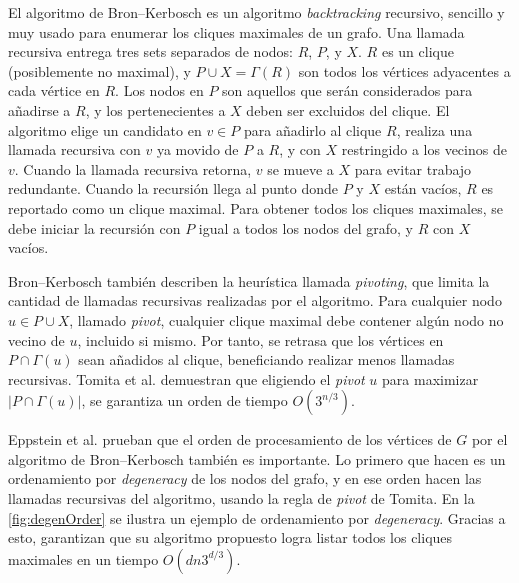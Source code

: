El algoritmo de Bron–Kerbosch \cite{bron1973algorithm} es un algoritmo \textit{backtracking} recursivo, sencillo y muy usado para enumerar los cliques maximales de un grafo. Una llamada recursiva entrega tres sets separados de nodos: $R$, $P$, y $X$. $R$ es un clique (posiblemente no maximal), y $P \cup X = \Gamma(R)$ son todos los vértices adyacentes a cada vértice en $R$. Los nodos en $P$ son aquellos que serán considerados para añadirse a $R$, y los pertenecientes a $X$ deben ser excluidos del clique. El algoritmo elige un candidato en $v \in P$ para añadirlo al clique $R$, realiza una llamada recursiva con $v$ ya movido de $P$ a $R$, y con $X$ restringido a los vecinos de $v$. Cuando la llamada recursiva retorna, $v$ se mueve a $X$ para evitar trabajo redundante. Cuando la recursión llega al punto donde $P$ y $X$ están vacíos, $R$ es reportado como un clique maximal. Para obtener todos los cliques maximales, se debe iniciar la recursión con $P$ igual a todos los nodos del grafo, y $R$ con $X$ vacíos.

Bron–Kerbosch \cite{bron1973algorithm} también describen la heurística llamada \textit{pivoting}, que limita la cantidad de llamadas recursivas realizadas por el algoritmo. Para cualquier nodo $u \in P \cup X$, llamado \textit{pivot}, cualquier clique maximal debe contener algún nodo no vecino de $u$, incluido si mismo. Por tanto, se retrasa que los vértices en $P \cap \Gamma(u)$ sean añadidos al clique, beneficiando realizar menos llamadas recursivas. Tomita et al. \cite{tomita2006worst} demuestran que eligiendo el \textit{pivot} $u$ para maximizar $|P \cap \Gamma(u)|$, se garantiza un orden de tiempo $O(3^{n/3})$.

Eppstein et al. \cite{eppstein2010listing} prueban que el orden de procesamiento de los vértices de $G$ por el algoritmo de Bron–Kerbosch también es importante. Lo primero que hacen es un ordenamiento por \textit{degeneracy} de los nodos del grafo, y en ese orden hacen las llamadas recursivas del algoritmo, usando la regla de \textit{pivot} de Tomita. En la \autoref{fig:degenOrder} se ilustra un ejemplo de ordenamiento por \textit{degeneracy}. Gracias a esto, garantizan que su algoritmo propuesto logra listar todos los cliques maximales en un tiempo $O(dn3^{d/3})$.



